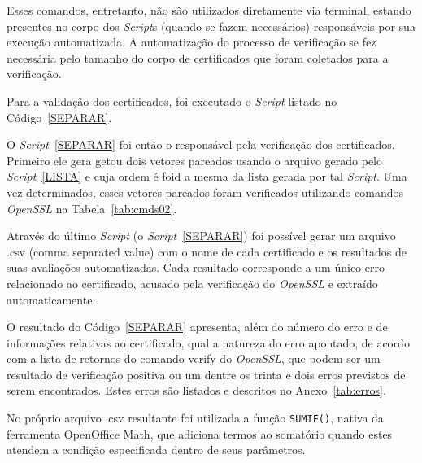 		Esses comandos, entretanto, não são utilizados diretamente via terminal, estando presentes no corpo dos \textit{Script}s (quando se fazem necessários) responsáveis por sua execução automatizada. A automatização do processo de verificação se fez necessária pelo tamanho do corpo de certificados que foram coletados para a verificação.

	    Para a validação dos certificados, foi executado o \textit{Script} listado no Código~\ref{SEPARAR}.

	    
	    O \textit{Script}~\ref{SEPARAR} foi então o responsável pela verificação dos certificados. Primeiro ele gera  getou dois vetores pareados usando o arquivo gerado pelo \textit{Script}~\ref{LISTA} e cuja ordem é  foid a mesma da lista gerada por tal \textit{Script}. Uma vez determinados, esses vetores pareados foram verificados utilizando comandos \textit{OpenSSL} na Tabela~\ref{tab:cmds02}.

	    Através do último \textit{Script} (o \textit{Script}~\ref{SEPARAR}) foi possível gerar um arquivo .csv (comma separated value) com o nome de cada certificado e os resultados de suas avaliações automatizadas. Cada resultado corresponde a um único erro relacionado ao certificado, acusado pela verificação do \textit{OpenSSL} e extraído automaticamente.

    	O resultado do Código~\ref{SEPARAR} apresenta, além do número do erro e de informações relativas ao certificado, qual a natureza do erro apontado, de acordo com a lista de retornos do comando verify do \textit{OpenSSL}, que podem ser um resultado de verificação positiva ou um dentre os trinta e dois erros previstos de serem encontrados. Estes erros são listados e descritos no Anexo~\ref{tab:erros}.

    	No próprio arquivo .csv resultante foi utilizada a função \texttt{SUMIF()}, nativa da ferramenta OpenOffice Math, que adiciona termos ao somatório quando estes atendem a condição especificada dentro de seus parâmetros.